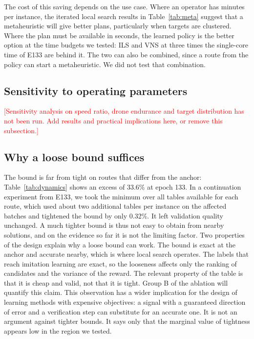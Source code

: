 \documentclass[preprint,12pt,authoryear]{elsarticle}
\newcommand{\placeholder}[1]{\textcolor{red}{[#1]}}
\begin{document}
The cost of this saving depends on the use case. Where an operator has minutes per instance, the iterated local search results in Table~\ref{tab:meta} suggest that a metaheuristic will give better plans, particularly when targets are clustered. Where the plan must be available in seconds, the learned policy is the better option at the time budgets we tested: ILS and VNS at three times the single-core time of E133 are behind it. The two can also be combined, since a route from the policy can start a metaheuristic. We did not test that combination.

\subsection{Sensitivity to operating parameters}

\placeholder{Sensitivity analysis on speed ratio, drone endurance and target distribution has not been run. Add results and practical implications here, or remove this subsection.}

\subsection{Why a loose bound suffices}

The bound is far from tight on routes that differ from the anchor: Table~\ref{tab:dynamics} shows an excess of 33.6\% at epoch 133. In a continuation experiment from E133, we took the minimum over all tables available for each route, which used about two additional tables per instance on the affected batches and tightened the bound by only 0.32\%. It left validation quality unchanged. A much tighter bound is thus not easy to obtain from nearby solutions, and on the evidence so far it is not the limiting factor. Two properties of the design explain why a loose bound can work. The bound is exact at the anchor and accurate nearby, which is where local search operates. The labels that reach imitation learning are exact, so the looseness affects only the ranking of candidates and the variance of the reward. The relevant property of the table is that it is cheap and valid, not that it is tight. Group B of the ablation will quantify this claim. This observation has a wider implication for the design of learning methods with expensive objectives: a signal with a guaranteed direction of error and a verification step can substitute for an accurate one. It is not an argument against tighter bounds. It says only that the marginal value of tightness appears low in the region we tested.
\end{document}
